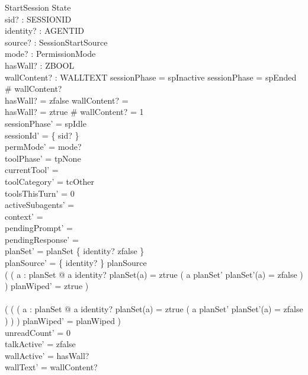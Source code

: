 \documentclass[a4paper,10pt,fleqn]{article}
\begin{document}
\begin{schema}{StartSession}
  \Delta State \\
  sid? : SESSIONID \\
  identity? : AGENTID \\
  source? : SessionStartSource \\
  mode? : PermissionMode \\
  hasWall? : ZBOOL \\
  wallContent? : \finset WALLTEXT
  \where
  sessionPhase = spInactive \lor sessionPhase = spEnded \\
  \# wallContent?  \\
  hasWall? = zfalse \implies wallContent? = \emptyset \\
  hasWall? = ztrue \implies \# wallContent? = 1 \\
  sessionPhase' = spIdle \\
  sessionId' = \{ sid? \} \\
  permMode' = mode? \\
  toolPhase' = tpNone \\
  currentTool' = \emptyset \\
  toolCategory' = tcOther \\
  toolsThisTurn' = 0 \\
  activeSubagents' = \emptyset \\
  context' = \langle \rangle \\
  pendingPrompt' = \emptyset \\
  pendingResponse' = \emptyset \\
  planSet' = planSet \oplus \{ identity? \mapsto zfalse \} \\
  planSource' = \{ identity? \} \ndres planSource \\
  ( ( \exists a : \dom planSet @
        a \neq identity? \land planSet(a) = ztrue \land
        ( a \notin \dom planSet' \lor planSet'(a) = zfalse ) )
    \land planWiped' = ztrue ) \\
  \lor \\
  ( ( \lnot ( \exists a : \dom planSet @
        a \neq identity? \land planSet(a) = ztrue \land
        ( a \notin \dom planSet' \lor planSet'(a) = zfalse ) ) )
    \land planWiped' = planWiped ) \\
  unreadCount' = 0 \\
  talkActive' = zfalse \\
  wallActive' = hasWall? \\
  wallText' = wallContent?
\end{schema}
\end{document}
